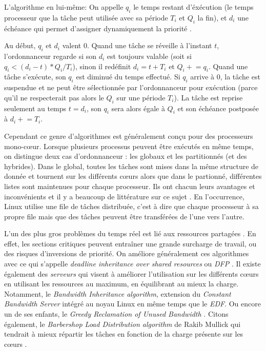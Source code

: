 \documentclass[letterpaper]{article}
\begin{document}
\newcommand{\pluseq}{\mathrel{+}=}

L'algorithme en lui-même:
On appelle \textit{$q_i$} le temps restant d'éxécution (le temps processeur que la tâche peut utilisée avec sa période \textit{$T_i$} et \textit{$Q_i$} la fin), et \textit{$d_i$} une échéance qui permet d'assigner dynamiquement la priorité \citep{LelliEDFLinux}.

Au début, \textit{$q_i$} et \textit{$d_i$} valent 0.
Quand une tâche se réveille à l'instant $t$, l'ordonnanceur regarde si son $d_i$ est toujours valable (soit si $q_i < (d_i - t) * Q_i/ T_i$), sinon il redéfinit $d_i = t + T_i$ et $Q_i \pluseq q_i$. Quand une tâche s'exécute, son $q_i$ est diminué du temps effectué. Si $q_i$ arrive à 0, la tâche est suspendue et ne peut être sélectionnée par l'ordonnanceur pour exécution (parce qu'il ne respecterait pas alors le $Q_i$ sur une période $T_i$). La tâche est reprise seulement au temps $t = d_i$, son $q_i$ sera alors égale à $Q_i$ et son échéance postposée à $d_i \pluseq T_i$.

Cependant ce genre d'algorithmes est généralement conçu pour des processeurs mono-cœur. Lorsque plusieurs processus peuvent être exécutés en même temps, on distingue deux cas d'ordonnanceur \citep{faggioli2009implementation}: les globaux et les partitionnés (et des hybrides). Dans le global, toutes les tâches sont mises dans la même structure de donnée et tournent sur les différents cœurs alors que dans le partionné, différentes listes sont maintenues pour chaque processeur. Ils ont chacun leurs avantages et inconvénients et il y a beaucoup de littérature sur ce sujet \citep{bastoni2010empirical, lelli2012experimental}.
En l'occurrence, Linux utilise une file de tâches distribuée, c'est à dire que chaque processeur à sa propre file mais que des tâches peuvent être transférées de l'une vers l'autre.

L'un des plus gros problèmes du temps réel est lié aux ressources partagées \citep{buttazzo2011hard}. En effet, les sections critiques peuvent entraîner une grande surcharge de travail, ou des risques d'inversions de priorité. On améliore généralement ces algorithmes avec ce qui s'appelle \textit{deadline inheritance over shared resources} ou \textit{DFP} \citep{jansen2003lightweight}. Il existe également des \textit{serveurs} qui visent à améliorer l'utilisation sur les différents cœurs en utilisant les ressources au maximum, en équilibrant au mieux la charge. Notamment, le \textit{Bandwidth Inheritance algorithm}, extension du \textit{Constant Bandwidth Server} \citep{Abeni:1998:IMA:827270.829047} intégré au noyau Linux en même temps que le \textit{EDF}. Ou encore un de ses enfants, le \textit{Greedy Reclamation of Unused Bandwidth} \citep{Lipari:2000:GRU:1947412.1947445}. Citons également, le \textit{Barbershop Load
Distribution algorithm} de Rakib Mullick qui tendrait à mieux répartir les tâches en fonction de la charge présente sur les cœurs \citep{BarbershopLoadDistribution}.
\end{document}
